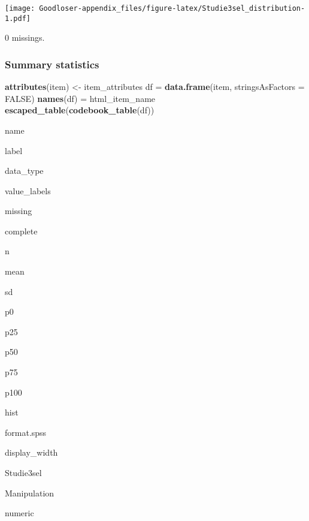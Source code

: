 \documentclass[]{book}
\newenvironment{Shaded}{\begin{snugshade}}{\end{snugshade}}
\newcommand{\KeywordTok}[1]{\textcolor[rgb]{0.13,0.29,0.53}{\textbf{#1}}}
\newcommand{\DataTypeTok}[1]{\textcolor[rgb]{0.13,0.29,0.53}{#1}}
\newcommand{\StringTok}[1]{\textcolor[rgb]{0.31,0.60,0.02}{#1}}
\newcommand{\OtherTok}[1]{\textcolor[rgb]{0.56,0.35,0.01}{#1}}
\newcommand{\OperatorTok}[1]{\textcolor[rgb]{0.81,0.36,0.00}{\textbf{#1}}}
\newcommand{\NormalTok}[1]{#1}
\begin{document}
\texttt{[image: Goodloser-appendix\_files/figure-latex/Studie3sel\_distribution-1.pdf]}

\begin{Shaded}
\end{Shaded}

0 missings.

\subsubsection{Summary statistics}\label{Studie3sel_summary}

\begin{Shaded}
\begin{Highlighting}[]
\KeywordTok{attributes}\NormalTok{(item) <-}\StringTok{ }\NormalTok{item_attributes}
\NormalTok{df =}\StringTok{ }\KeywordTok{data.frame}\NormalTok{(item, }\DataTypeTok{stringsAsFactors =} \OtherTok{FALSE}\NormalTok{)}
\KeywordTok{names}\NormalTok{(df) =}\StringTok{ }\NormalTok{html_item_name}
\KeywordTok{escaped_table}\NormalTok{(}\KeywordTok{codebook_table}\NormalTok{(df))}
\end{Highlighting}
\end{Shaded}

name

label

data\_type

value\_labels

missing

complete

n

mean

sd

p0

p25

p50

p75

p100

hist

format.spss

display\_width

Studie3sel

Manipulation

numeric
\end{document}
